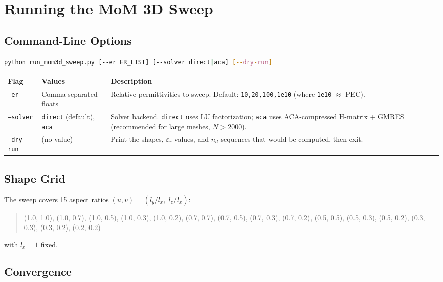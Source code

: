 \documentclass[a4paper,11pt]{article}
\begin{document}
\section{Running the MoM 3D Sweep}

\subsection{Command-Line Options}

\begin{lstlisting}[language=bash]
python run_mom3d_sweep.py [--er ER_LIST] [--solver direct|aca] [--dry-run]
\end{lstlisting}

\begin{center}
\begin{tabular}{@{}llp{6cm}@{}}
\toprule
Flag & Values & Description \\
\midrule
\texttt{--er} & Comma-separated floats
    & Relative permittivities to sweep.
      Default: \texttt{10,20,100,1e10} (where \texttt{1e10} $\approx$ PEC). \\
\texttt{--solver} & \texttt{direct} (default), \texttt{aca}
    & Solver backend.  \texttt{direct} uses LU factorization;
      \texttt{aca} uses ACA-compressed H-matrix + GMRES (recommended for
      large meshes, $N > 2000$). \\
\texttt{--dry-run} & (no value)
    & Print the shapes, $\varepsilon_r$ values, and $n_d$ sequences
      that would be computed, then exit. \\
\bottomrule
\end{tabular}
\end{center}

\subsection{Shape Grid}
\label{sec:mom3d_shapegrid}

The sweep covers 15 aspect ratios $(u,v) = (l_y/l_x,\; l_z/l_x)$:
%
\begin{quote}
\ttfamily
(1.0, 1.0), (1.0, 0.7), (1.0, 0.5), (1.0, 0.3), (1.0, 0.2),
(0.7, 0.7), (0.7, 0.5), (0.7, 0.3), (0.7, 0.2),
(0.5, 0.5), (0.5, 0.3), (0.5, 0.2),
(0.3, 0.3), (0.3, 0.2), (0.2, 0.2)
\end{quote}
%
with $l_x = 1$ fixed.

\subsection{Convergence}
\end{document}
